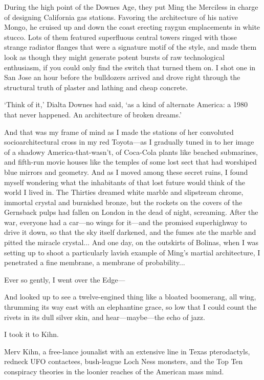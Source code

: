 During the high point of the Downes Age, they put Ming the Merciless in charge of designing California gas stations. Favoring the architecture of his native Mongo, he cruised up and down the coast erecting raygun emplacements in white stucco. Lots of them featured superfluous central towers ringed with those strange radiator flanges that were a signature motif of the style, and made them look as though they might generate potent bursts of raw technological enthusiasm, if you could only find the switch that turned them on. I shot one in San Jose an hour before the bulldozers arrived and drove right through the structural truth of plaster and lathing and cheap concrete.

`Think of it,' Dialta Downes had said, `as a kind of alternate America: a 1980 that never happened. An architecture of broken dreams.'

And that was my frame of mind as I made the stations of her convoluted socioarchitectural cross in my red Toyota—as I gradually tuned in to her image of a shadowy America-that-wasn't, of Coca-Cola plants like beached submarines, and fifth-run movie houses like the temples of some lost sect that had worshiped blue mirrors and geometry. And as I moved among these secret ruins, I found myself wondering what the inhabitants of that lost future would think of the world I lived in. The Thirties dreamed white marble and slipstream chrome, immortal crystal and burnished bronze, but the rockets on the covers of the Gernsback pulps had fallen on London in the dead of night, screaming. After the war, everyone had a car—no wings for it—and the promised superhighway to drive it down, so that the sky itself darkened, and the fumes ate the marble and pitted the miracle crystal...
And one day, on the outskirts of Bolinas, when I was setting up to shoot a particularly lavish example of Ming's martial architecture, I penetrated a fine membrane, a membrane of probability...

Ever so gently, I went over the Edge—

And looked up to see a twelve-engined thing like a bloated boomerang, all wing, thrumming its way east with an elephantine grace, so low that I could count the rivets in its dull silver skin, and hear—maybe—the echo of jazz.

I took it to Kihn.

Merv Kihn, a free-lance jounalist with an extensive line in Texas pterodactyls, redneck UFO contactees, bush-league Loch Ness monsters, and the Top Ten conspiracy theories in the loonier reaches of the American mass mind.

